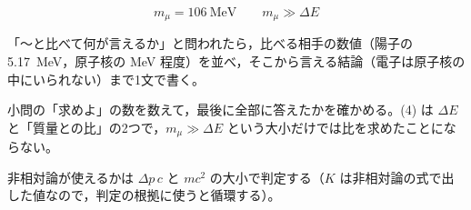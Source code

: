 \[ m_{\mu}=\qty{106}{\mega\electronvolt}\qquad m_{\mu}\gg\Delta E \]
\item 「〜と比べて何が言えるか」と問われたら，比べる相手の数値（陽子の \qty{5.17}{\mega\electronvolt}，原子核の \unit{\mega\electronvolt} 程度）を並べ，そこから言える結論（電子は原子核の中にいられない）まで1文で書く。
\item 小問の「求めよ」の数を数えて，最後に全部に答えたかを確かめる。(4) は $\Delta E$ と「質量との比」の2つで，$m_{\mu}\gg\Delta E$ という大小だけでは比を求めたことにならない。
\item 非相対論が使えるかは $\Delta p\,c$ と $mc^{2}$ の大小で判定する（$K$ は非相対論の式で出した値なので，判定の根拠に使うと循環する）。
